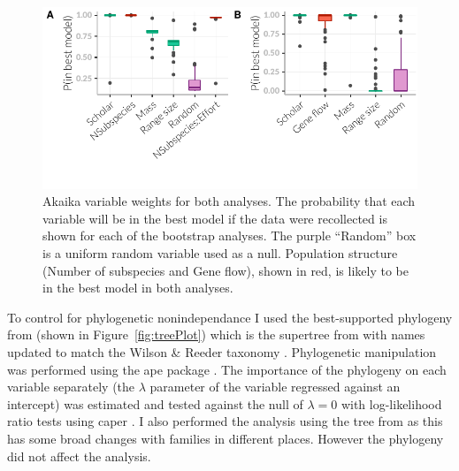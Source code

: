 \begin{knitrout}\footnotesize
{}\color{fgcolor}\begin{figure}[t]

{\centering \includegraphics[width=\textwidth,trim = 0 1cm 0 0]{figure/fstITPlots-1} 

}

\caption[Akaika variable weights for $F_{ST}$ analysis.]{Akaika variable weights for both analyses. The probability that each variable will be in the best model if the data were recollected is shown for each of the bootstrap analyses. The purple ``Random'' box is a uniform random variable used as a null. Population structure (Number of subspecies and Gene flow), shown in red, is likely to be in the best model in both analyses.}\label{fig:fstITPlots}
\end{figure}


\end{knitrout}




To control for phylogenetic nonindependance I used the best-supported phylogeny from \textcite{fritz2009geographical} (shown in Figure~\ref{fig:treePlot}) which is the supertree from \cite{bininda2007delayed} with names updated to match the Wilson \& Reeder taxonomy \cite{wilson2005mammal}.
Phylogenetic manipulation was performed using the ape package \cite{ape}.
The importance of the phylogeny on each variable separately (the $\lambda$ parameter of the variable regressed against an intercept) was estimated and tested against the null of $\lambda = 0$ with log-likelihood ratio tests using caper \cite{caper}.
I also performed the analysis using the tree from \cite{jones2005bats} as this has some broad changes with families in different places.
However the phylogeny did not affect the analysis.

